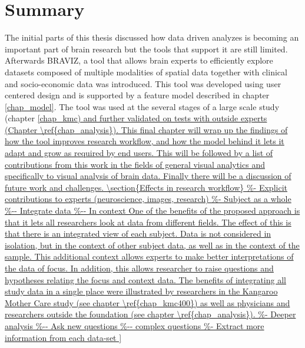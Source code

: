 

\section{Summary}

The initial parts of this thesis discussed how data driven analyzes is becoming an important part of brain research but the tools that support it are still limited. Afterwards BRAVIZ, a tool that allows brain experts to efficiently explore datasets composed of multiple modalities of spatial data together with clinical and socio-economic data was introduced. This tool was developed using user centered design and is supported by a feature model described in chapter \ref{chap_model}. The tool was used at the several stages of a large scale study (chapter \ref{chap_kmc) and further validated on tests with outside experts (Chapter \ref{chap_analysis}). This final chapter will wrap up the findings of how the tool improves research workflow, and how the model behind it lets it adapt and grow as required by end users. This will be followed by a list of contributions from this work in the fields of general visual analytics and specifically to visual analysis of brain data. Finally there will be a discussion of future work and challenges.


\section{Effects in research workflow}



One of the benefits of the proposed approach is that it lets all researchers look at data from different fields. The effect of this is that there is an integrated view of each subject. Data is not considered in isolation, but in the context of other subject data, as well as in the context of the sample. This additional context allows experts to make better interpretations of the data of focus. In addition, this allows researcher to raise questions and hypotheses relating the focus and context data. The benefits of integrating all study data in a single place were illustrated by researchers in the Kangaroo Mother Care study (see chapter \ref{chap_kmc400}) as well as physicians and researchers outside the foundation (see chapter \ref{chap_analysis}).


}
